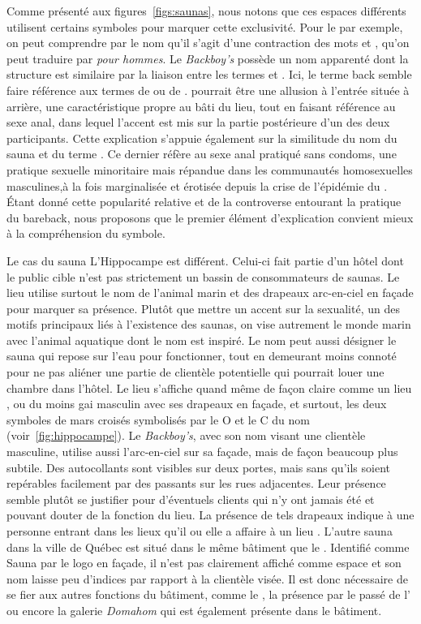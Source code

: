 Comme présenté aux figures~\ref{figs:saunas}, nous notons que ces espaces différents utilisent certains symboles pour marquer cette exclusivité.
Pour le  par exemple, on peut comprendre par le nom qu'il s'agit d'une contraction des mots  et , qu'on peut traduire par \emph{pour hommes}.
Le \emph{Backboy's} possède un nom apparenté dont la structure est similaire par la liaison entre les termes  et .
Ici, le terme back semble faire référence aux termes de  ou de .
 pourrait être une allusion à l'entrée située à arrière, une caractéristique propre au bâti du lieu, tout en faisant référence au sexe anal, dans lequel l'accent est mis sur la partie postérieure d'un des deux participants.
Cette explication s'appuie également sur la similitude du nom du sauna et du terme . 
Ce dernier réfère au sexe anal pratiqué sans condoms, une pratique sexuelle minoritaire mais répandue dans les communautés homosexuelles masculines,à la fois marginalisée et érotisée depuis la crise de l'épidémie du \sida{}\missref{}.
Étant donné cette popularité relative et de la controverse entourant la pratique du bareback, nous proposons que le premier élément d'explication convient mieux à la compréhension du symbole.

Le cas du sauna L'Hippocampe est différent.
Celui-ci fait partie d'un hôtel dont le public cible n'est pas strictement un bassin de consommateurs de saunas.
Le lieu utilise surtout le nom de l'animal marin et des drapeaux arc-en-ciel en façade pour marquer sa présence.
Plutôt que mettre un accent sur la sexualité, un des motifs principaux liés à l'existence des saunas, on vise autrement le monde marin avec l'animal aquatique dont le nom est inspiré.
Le nom peut aussi désigner le sauna qui repose sur l'eau pour fonctionner, tout en demeurant moins connoté pour ne pas aliéner une partie de clientèle potentielle qui pourrait louer une chambre dans l'hôtel.
Le lieu s'affiche quand même de façon claire comme un lieu \lgbt{}, ou du moins gai masculin avec ses drapeaux en façade, et surtout, les deux symboles de mars croisés symbolisés par le O et le C du nom (voir~\ref{fig:hippocampe}).
Le \emph{Backboy's}, avec son nom visant une clientèle masculine, utilise aussi l'arc-en-ciel sur sa façade, mais de façon beaucoup plus subtile.
Des autocollants sont visibles sur deux portes, mais sans qu'ils soient repérables facilement par des passants sur les rues adjacentes.
Leur présence semble plutôt se justifier pour d'éventuels clients qui n'y ont jamais été et pouvant douter de la fonction du lieu.
La présence de tels drapeaux indique à une personne entrant dans les lieux qu'il ou elle a affaire à un lieu \lgbt{}.
L'autre sauna dans la ville de Québec est situé dans le même bâtiment que le .
Identifié comme Sauna par le logo en façade, il n'est pas clairement affiché comme espace \lgbt{} et son nom laisse peu d'indices par rapport à la clientèle visée.
Il est donc nécessaire de se fier aux autres fonctions du bâtiment, comme le , la présence par le passé de l'\ascgcn{} ou encore la galerie \emph{Domahom} qui est également présente dans le bâtiment.

